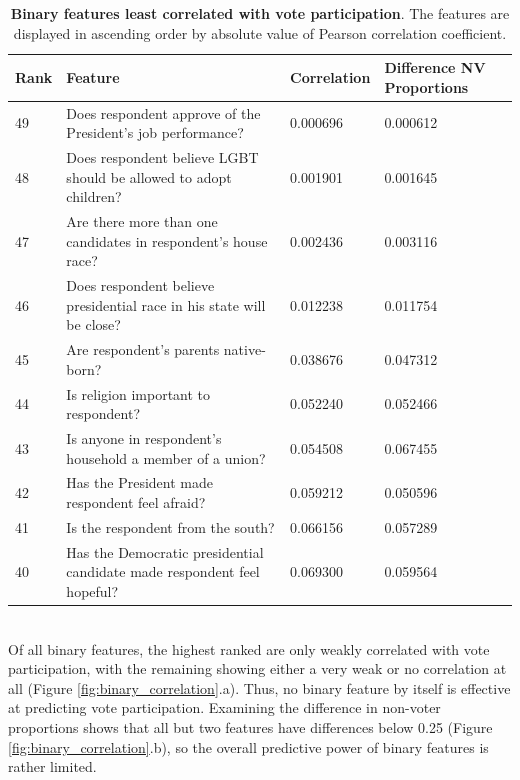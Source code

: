 \documentclass{article}
\begin{document}
	\begin{table}[h!]
		\begin{center}
			\begin{tabular}{ |m{1cm}|m{9cm}|m{2cm}|m{2.5cm}| } 
				\hline
				Rank & Feature & Correlation & Difference NV Proportions  \\ 
				\hline
				49 & Does respondent approve of the President's job performance? & 0.000696 & 0.000612 \\
				\hline
				48 & Does respondent believe LGBT should be allowed to adopt children? & 0.001901 & 0.001645 \\
				\hline
				47 & Are there more than one candidates in respondent's house race? & 0.002436 & 0.003116 \\
				\hline
				46 & Does respondent believe presidential race in his state will be close? & 0.012238 & 0.011754 \\
				\hline
				45 & Are respondent's parents native-born? & 0.038676 & 0.047312 \\
				\hline
				44 & Is religion important to respondent? & 0.052240 & 0.052466 \\
				\hline
				43 & Is anyone in respondent's household a member of a union? & 0.054508 & 0.067455 \\
				\hline
				42 & Has the President made respondent feel afraid? & 0.059212 & 0.050596 \\
				\hline
				41 & Is the respondent from the south? & 0.066156 & 0.057289 \\
				\hline
				40 & Has the Democratic presidential candidate made respondent feel hopeful? & 0.069300 & 0.059564 \\
				\hline
			\end{tabular}
			\caption{\textbf{Binary features least correlated with vote participation}. The features are displayed in ascending order by absolute value of Pearson correlation coefficient.}
			\label{table:binary_features_least_correlated}
		\end{center}
	\end{table}
	\hfill \\
	Of all binary features, the highest ranked are only weakly correlated with vote participation, with the remaining showing either a very weak or no correlation at all (Figure \ref{fig:binary_correlation}.a). Thus, no binary feature by itself is effective at predicting vote participation. Examining the difference in non-voter proportions shows that all but two features have differences below 0.25 (Figure \ref{fig:binary_correlation}.b), so the overall predictive power of binary features is rather limited.
\end{document}
